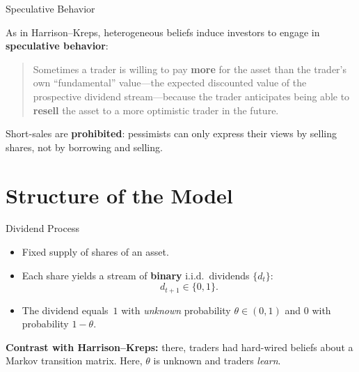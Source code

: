 \documentclass[11pt,aspectratio=169]{beamer}
\begin{document}
\begin{frame}{Speculative Behavior}

As in Harrison--Kreps, heterogeneous beliefs induce investors to
engage in \textbf{speculative behavior}:

\bigskip

\begin{quote}
Sometimes a trader is willing to pay \textbf{more} for the asset
than the trader's own ``fundamental'' value---the expected discounted
value of the prospective dividend stream---because the trader
anticipates being able to \textbf{resell} the asset to a more
optimistic trader in the future.
\end{quote}

\bigskip

Short-sales are \textbf{prohibited}: pessimists can only express
their views by selling shares, not by borrowing and selling.

\end{frame}


\section{Structure of the Model}

\begin{frame}{Dividend Process}

\begin{itemize}
\item Fixed supply of shares of an asset.
\item Each share yields a stream of \textbf{binary} i.i.d.\ dividends
      $\{d_t\}$:
      \[
        d_{t+1} \in \{0,1\}.
      \]
\item The dividend equals~$1$ with \emph{unknown} probability
      $\theta\in(0,1)$ and $0$ with probability $1-\theta$.
\end{itemize}

\medskip

\textbf{Contrast with Harrison--Kreps:} there, traders had hard-wired
beliefs about a Markov transition matrix. Here, $\theta$ is unknown
and traders \emph{learn}.

\end{frame}
\end{document}
